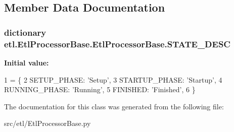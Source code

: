 \subsection{Member Data Documentation}
\hypertarget{classetl_1_1EtlProcessorBase_1_1EtlProcessorBase_a28b9bc31c003ef44e04c39c4b4b95073}{
\subsubsection[{S\-T\-A\-T\-E\-\_\-\-D\-E\-S\-C}]{\setlength{\rightskip}{0pt plus 5cm}dictionary etl.\-Etl\-Processor\-Base.\-Etl\-Processor\-Base.\-S\-T\-A\-T\-E\-\_\-\-D\-E\-S\-C\hspace{0.3cm}{\ttfamily [static]}}}\label{classetl_1_1EtlProcessorBase_1_1EtlProcessorBase_a28b9bc31c003ef44e04c39c4b4b95073}
{\bfseries Initial value\-:}
\begin{DoxyCode}
1 = \{
2         SETUP\_PHASE:    \textcolor{stringliteral}{'Setup'},
3         STARTUP\_PHASE:  \textcolor{stringliteral}{'Startup'},
4         RUNNING\_PHASE:  \textcolor{stringliteral}{'Running'},
5         FINISHED:       \textcolor{stringliteral}{'Finished'},
6     \}
\end{DoxyCode}


The documentation for this class was generated from the following file\-:\begin{DoxyCompactItemize}
\item 
src/etl/Etl\-Processor\-Base.\-py\end{DoxyCompactItemize}
